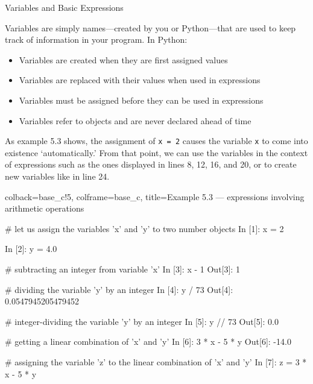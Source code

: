 \documentclass[a4paper,11pt]{book}
\newcommand{\question}[1]{%
    \begin{tcolorbox}[colback=comp_c!10,colframe=comp_c,sidebyside align=top,width=\linewidth,before skip=1ex]
        #1
    \end{tcolorbox}%
    \switchcolumn%
}
\newcommand{\note}[1]{%
    \begin{tcolorbox}[colback=white!0,colframe=white!10,width=\linewidth,before skip=1ex]
        #1
    \end{tcolorbox}         
}
\begin{document}
\begin{paracol}{2}
	\question{\raggedright Variables and Basic Expressions}
	\note{Variables are simply names—created by you or Python—that are used to keep track of information in your program. In Python:
	\begin{itemize}
		\item Variables are created when they are first assigned values
		\item Variables are replaced with their values when used in expressions
		\item Variables must be assigned before they can be used in expressions
		\item Variables refer to objects and are never declared ahead of time
	\end{itemize}
    As example 5.3 shows, the assignment of \texttt{x = 2} causes the variable \texttt{x} to come into existence `automatically.' From that point, we can use the variables in the context of expressions such as the ones displayed in lines 8, 12, 16, and 20, or to create new variables like in line 24.
    }
\end{paracol}

\begin{pythoncode}[linenos=true,]{colback=base_c!5, colframe=base_c, title=\sffamily Example 5.3 --- expressions involving arithmetic operations}
	
# let us assign the variables 'x' and 'y' to two number objects
In [1]: x = 2

In [2]: y = 4.0	

# subtracting an integer from variable 'x'
In [3]: x - 1
Out[3]: 1

# dividing the variable 'y' by an integer
In [4]: y / 73
Out[4]: 0.0547945205479452

# integer-dividing the variable 'y' by an integer
In [5]: y // 73
Out[5]: 0.0

# getting a linear combination of 'x' and 'y'
In [6]: 3 * x - 5 * y
Out[6]: -14.0

# assigning the variable 'z' to the linear combination of 'x' and 'y'
In [7]: z = 3 * x - 5 * y

\end{pythoncode}
\end{document}
